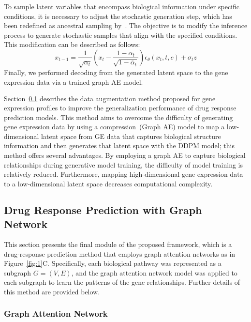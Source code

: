 \documentclass[runningheads]{llncs}
\begin{document}
To sample latent variables that encompass biological information under specific conditions, it is necessary to adjust the stochastic generation step, which has been redefined as ancestral sampling by~\cite{17, 33}. The objective is to modify the inference process to generate stochastic samples that align with the specified conditions. This modification can be described as follows:
%
\begin{equation}
x_{t-1} = \frac{1}{\sqrt{\alpha_t}} \left( x_t - \frac{1-\alpha_t}{\sqrt{1-\overline{\alpha}_t}} \right) \epsilon_{\theta}(x_t, t, c) + \sigma_t z
\end{equation}
%
Finally, we performed decoding from the generated latent space to the gene expression data via a trained graph AE model.

Section~\ref{sec:response} describes the data augmentation method proposed for gene expression profiles to improve the generalization performance of drug response prediction models. This method aims to overcome the difficulty of generating gene expression data by using a compression~(Graph AE) model to map a low-dimensional latent space from GE data that captures biological structure information and then generates that latent space with the DDPM model; this method offers several advantages. By employing a graph AE to capture biological relationships during generative model training, the difficulty of model training is relatively reduced. Furthermore, mapping high-dimensional gene expression data to a low-dimensional latent space decreases computational complexity.

\subsection{Drug Response Prediction with Graph Network}\label{sec:response}

This section presents the final module of the proposed framework,
which is a drug-response prediction method that employs graph
attention networks as in Figure~\ref{fig:1}C. Specifically, each biological
pathway was represented as a subgraph $G=(V, E)$, and the graph
attention network model was applied to each subgraph to learn the
patterns of the gene relationships. Further details of this method
are provided below.

\subsubsection{Graph Attention Network}\label{sec:gat}
\end{document}

